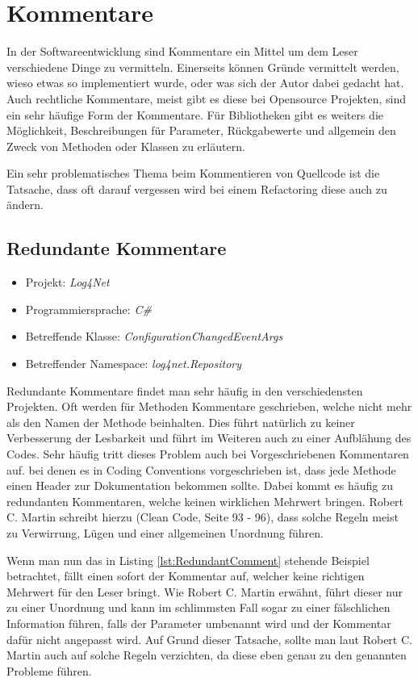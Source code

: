 \section{Kommentare}
In der Softwareentwicklung sind Kommentare ein Mittel um dem Leser verschiedene Dinge zu vermitteln.
Einerseits können Gründe vermittelt werden, wieso etwas so implementiert wurde, oder was sich der 
Autor dabei gedacht hat. Auch rechtliche Kommentare, meist gibt es diese bei Opensource Projekten,
sind ein sehr häufige Form der Kommentare. Für Bibliotheken gibt es weiters die Möglichkeit, Beschreibungen
für Parameter, Rückgabewerte und allgemein den Zweck von Methoden oder Klassen zu erläutern. 

Ein sehr problematisches Thema beim Kommentieren von Quellcode ist die Tatsache, dass oft darauf vergessen wird
bei einem Refactoring diese auch zu ändern. 

\subsection{Redundante Kommentare}
\begin{itemize}
	\item Projekt: \textit{Log4Net}
	\item Programmiersprache: \textit{C\#}
	\item Betreffende Klasse: \textit{ConfigurationChangedEventArgs}
	\item Betreffender Namespace: \textit{log4net.Repository}
\end{itemize}

Redundante Kommentare findet man sehr häufig in den verschiedensten Projekten. Oft werden für Methoden Kommentare geschrieben, welche nicht mehr als den Namen der Methode beinhalten. Dies führt natürlich zu keiner Verbesserung der Lesbarkeit und führt im Weiteren auch zu einer Aufblähung des Codes. Sehr häufig tritt dieses Problem auch bei Vorgeschriebenen Kommentaren auf. bei denen es in Coding Conventions vorgeschrieben ist, dass jede Methode einen Header zur Dokumentation
bekommen sollte. Dabei kommt es häufig zu redundanten Kommentaren, welche keinen wirklichen Mehrwert bringen. Robert C. Martin schreibt hierzu (Clean Code, Seite 93 - 96), dass solche Regeln meist zu Verwirrung, Lügen und einer allgemeinen Unordnung führen. 

Wenn man nun das in Listing \ref{lst:RedundantComment} stehende Beispiel betrachtet, fällt einen sofort der Kommentar auf, welcher keine richtigen Mehrwert
für den Leser bringt. Wie Robert C. Martin erwähnt, führt dieser nur zu einer Unordnung und kann im schlimmsten Fall sogar zu einer fälschlichen Information führen,
falls der Parameter umbenannt wird und der Kommentar dafür nicht angepasst wird. Auf Grund dieser Tatsache, sollte man laut Robert C. Martin auch auf solche Regeln verzichten, da diese eben genau zu den genannten Probleme führen.

